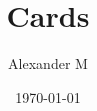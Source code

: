 \documentclass[a4paper,12pt]{article}
\begin{document}
	
	\title{Cards}
	\author{Alexander M}
	\date{\today}
	\newpage
	\newpage
	
	
	
\end{document}
